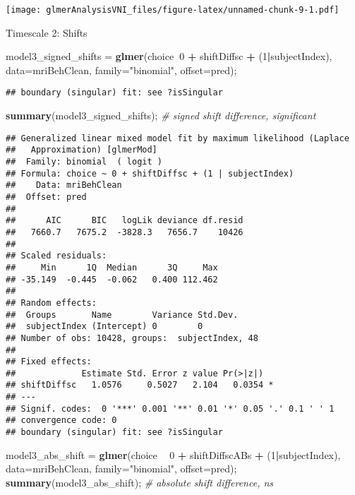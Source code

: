 \documentclass[]{article}
\newenvironment{Shaded}{\begin{snugshade}}{\end{snugshade}}
\newcommand{\CommentTok}[1]{\textcolor[rgb]{0.56,0.35,0.01}{\textit{#1}}}
\newcommand{\DataTypeTok}[1]{\textcolor[rgb]{0.13,0.29,0.53}{#1}}
\newcommand{\DecValTok}[1]{\textcolor[rgb]{0.00,0.00,0.81}{#1}}
\newcommand{\KeywordTok}[1]{\textcolor[rgb]{0.13,0.29,0.53}{\textbf{#1}}}
\newcommand{\NormalTok}[1]{#1}
\newcommand{\OperatorTok}[1]{\textcolor[rgb]{0.81,0.36,0.00}{\textbf{#1}}}
\newcommand{\StringTok}[1]{\textcolor[rgb]{0.31,0.60,0.02}{#1}}
\begin{document}
\texttt{[image: glmerAnalysisVNI\_files/figure-latex/unnamed-chunk-9-1.pdf]}

Timescale 2: Shifts

\begin{Shaded}
\begin{Highlighting}[]
\NormalTok{model3_signed_shifts =}\StringTok{ }\KeywordTok{glmer}\NormalTok{(choice}\OperatorTok{~}\DecValTok{0} \OperatorTok{+}\StringTok{ }\NormalTok{shiftDiffsc }\OperatorTok{+}\StringTok{ }\NormalTok{(}\DecValTok{1}\OperatorTok{|}\NormalTok{subjectIndex), }\DataTypeTok{data=}\NormalTok{mriBehClean, }\DataTypeTok{family=}\StringTok{"binomial"}\NormalTok{, }\DataTypeTok{offset=}\NormalTok{pred);}
\end{Highlighting}
\end{Shaded}

\begin{verbatim}
## boundary (singular) fit: see ?isSingular
\end{verbatim}

\begin{Shaded}
\begin{Highlighting}[]
\KeywordTok{summary}\NormalTok{(model3_signed_shifts); }\CommentTok{# signed shift difference, significant}
\end{Highlighting}
\end{Shaded}

\begin{verbatim}
## Generalized linear mixed model fit by maximum likelihood (Laplace
##   Approximation) [glmerMod]
##  Family: binomial  ( logit )
## Formula: choice ~ 0 + shiftDiffsc + (1 | subjectIndex)
##    Data: mriBehClean
##  Offset: pred
## 
##      AIC      BIC   logLik deviance df.resid 
##   7660.7   7675.2  -3828.3   7656.7    10426 
## 
## Scaled residuals: 
##     Min      1Q  Median      3Q     Max 
## -35.149  -0.445  -0.062   0.400 112.462 
## 
## Random effects:
##  Groups       Name        Variance Std.Dev.
##  subjectIndex (Intercept) 0        0       
## Number of obs: 10428, groups:  subjectIndex, 48
## 
## Fixed effects:
##             Estimate Std. Error z value Pr(>|z|)  
## shiftDiffsc   1.0576     0.5027   2.104   0.0354 *
## ---
## Signif. codes:  0 '***' 0.001 '**' 0.01 '*' 0.05 '.' 0.1 ' ' 1
## convergence code: 0
## boundary (singular) fit: see ?isSingular
\end{verbatim}

\begin{Shaded}
\begin{Highlighting}[]
\NormalTok{model3_abs_shift =}\StringTok{ }\KeywordTok{glmer}\NormalTok{(choice }\OperatorTok{~}\StringTok{ }\DecValTok{0} \OperatorTok{+}\StringTok{ }\NormalTok{shiftDiffscABs }\OperatorTok{+}\StringTok{ }\NormalTok{(}\DecValTok{1}\OperatorTok{|}\NormalTok{subjectIndex), }\DataTypeTok{data=}\NormalTok{mriBehClean, }\DataTypeTok{family=}\StringTok{"binomial"}\NormalTok{, }\DataTypeTok{offset=}\NormalTok{pred);}
\KeywordTok{summary}\NormalTok{(model3_abs_shift); }\CommentTok{# absolute shift difference, ns}
\end{Highlighting}
\end{Shaded}
\end{document}
